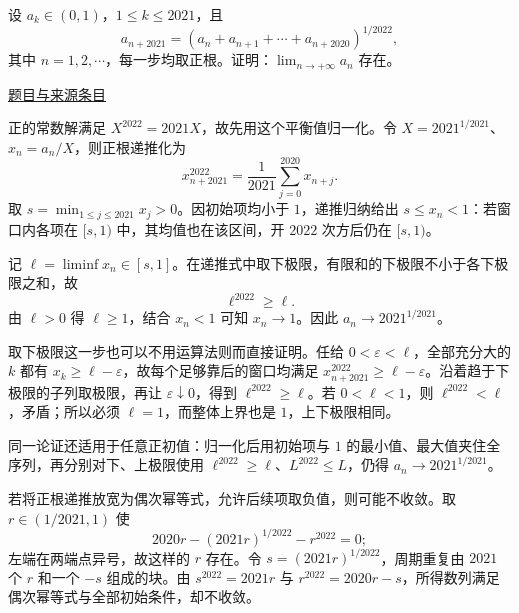 \documentclass[12pt,fontset=fandol]{ctexart}
\begin{document}
\begin{example}[来源序号5]\label{ex:ch08-13th-A-makeup:5}\label{pr:ch08-13th-A-makeup:5}

设 $a_{k}\in(0,1)$，$1\leq k\leq 2021$，且
\[
a_{n+2021}=\left(a_{n}+a_{n+1}+\cdots+a_{n+2020}\right)^{1/2022},
\]
其中 $n=1,2,\cdots$，每一步均取正根。证明：$\lim_{n\to+\infty}a_{n}$ 存在。

\par\href{https://github.com/lzxcr/cmc-mathematics/blob/64916fa1fdbc3e444a652eca204d5669058ee321/src/problems/preliminary/13-makeup/05.md}{题目与来源条目}

\end{example}

\begin{solve}\label{ans:ch08-13th-A-makeup:5}

正的常数解满足 $X^{2022}=2021X$，故先用这个平衡值归一化。令 $X=2021^{1/2021}$、$x_n=a_n/X$，则正根递推化为
\[
x_{n+2021}^{2022}=\frac1{2021}\sum_{j=0}^{2020}x_{n+j}.
\]
取 $s=\min_{1\leq j\leq2021}x_j>0$。因初始项均小于 $1$，递推归纳给出 $s\leq x_n<1$：若窗口内各项在 $[s,1)$ 中，其均值也在该区间，开 $2022$ 次方后仍在 $[s,1)$。

记 $\ell=\liminf x_n\in[s,1]$。在递推式中取下极限，有限和的下极限不小于各下极限之和，故
\[
\ell^{2022}\geq\ell.
\]
由 $\ell>0$ 得 $\ell\geq1$，结合 $x_n<1$ 可知 $x_n\to1$。因此 $a_n\to2021^{1/2021}$。

取下极限这一步也可以不用运算法则而直接证明。任给 $0<\varepsilon<\ell$，全部充分大的 $k$ 都有 $x_k\ge\ell-\varepsilon$，故每个足够靠后的窗口均满足 $x_{n+2021}^{2022}\ge\ell-\varepsilon$。沿着趋于下极限的子列取极限，再让 $\varepsilon\downarrow0$，得到 $\ell^{2022}\ge\ell$。若 $0<\ell<1$，则 $\ell^{2022}<\ell$，矛盾；所以必须 $\ell=1$，而整体上界也是 $1$，上下极限相同。

\end{solve}

\begin{remark}[方法与条件]同一论证还适用于任意正初值：归一化后用初始项与 $1$ 的最小值、最大值夹住全序列，再分别对下、上极限使用 $\ell^{2022}\geq\ell$、$L^{2022}\leq L$，仍得 $a_n\to2021^{1/2021}$。

若将正根递推放宽为偶次幂等式，允许后续项取负值，则可能不收敛。取 $r\in(1/2021,1)$ 使
\[
2020r-(2021r)^{1/2022}-r^{2022}=0;
\]
左端在两端点异号，故这样的 $r$ 存在。令 $s=(2021r)^{1/2022}$，周期重复由 $2021$ 个 $r$ 和一个 $-s$ 组成的块。由 $s^{2022}=2021r$ 与 $r^{2022}=2020r-s$，所得数列满足偶次幂等式与全部初始条件，却不收敛。\end{remark}
\end{document}
